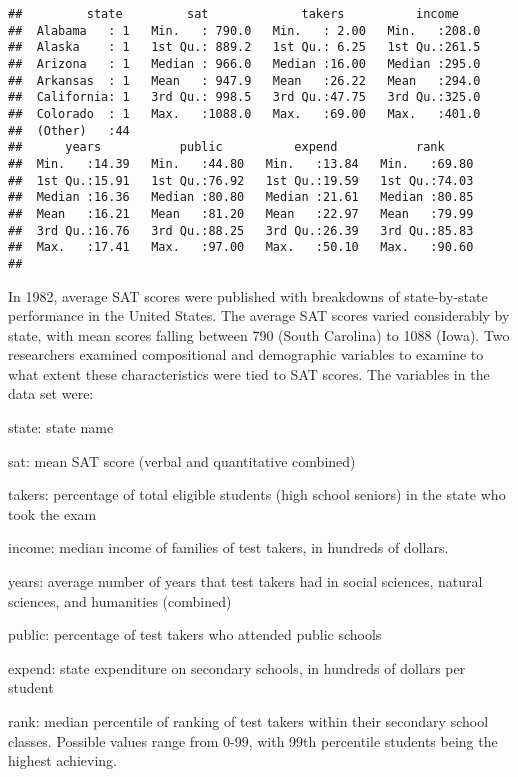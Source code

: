 \documentclass[]{article}
\begin{document}
\begin{verbatim}
##         state         sat             takers          income     
##  Alabama   : 1   Min.   : 790.0   Min.   : 2.00   Min.   :208.0  
##  Alaska    : 1   1st Qu.: 889.2   1st Qu.: 6.25   1st Qu.:261.5  
##  Arizona   : 1   Median : 966.0   Median :16.00   Median :295.0  
##  Arkansas  : 1   Mean   : 947.9   Mean   :26.22   Mean   :294.0  
##  California: 1   3rd Qu.: 998.5   3rd Qu.:47.75   3rd Qu.:325.0  
##  Colorado  : 1   Max.   :1088.0   Max.   :69.00   Max.   :401.0  
##  (Other)   :44                                                   
##      years           public          expend           rank      
##  Min.   :14.39   Min.   :44.80   Min.   :13.84   Min.   :69.80  
##  1st Qu.:15.91   1st Qu.:76.92   1st Qu.:19.59   1st Qu.:74.03  
##  Median :16.36   Median :80.80   Median :21.61   Median :80.85  
##  Mean   :16.21   Mean   :81.20   Mean   :22.97   Mean   :79.99  
##  3rd Qu.:16.76   3rd Qu.:88.25   3rd Qu.:26.39   3rd Qu.:85.83  
##  Max.   :17.41   Max.   :97.00   Max.   :50.10   Max.   :90.60  
## 
\end{verbatim}

In 1982, average SAT scores were published with breakdowns of
state-by-state performance in the United States. The average SAT scores
varied considerably by state, with mean scores falling between 790
(South Carolina) to 1088 (Iowa). Two researchers examined compositional
and demographic variables to examine to what extent these
characteristics were tied to SAT scores. The variables in the data set
were:

state: state name

sat: mean SAT score (verbal and quantitative combined)

takers: percentage of total eligible students (high school seniors) in
the state who took the exam

income: median income of families of test takers, in hundreds of
dollars.

years: average number of years that test takers had in social sciences,
natural sciences, and humanities (combined)

public: percentage of test takers who attended public schools

expend: state expenditure on secondary schools, in hundreds of dollars
per student

rank: median percentile of ranking of test takers within their secondary
school classes. Possible values range from 0-99, with 99th percentile
students being the highest achieving.
\end{document}
